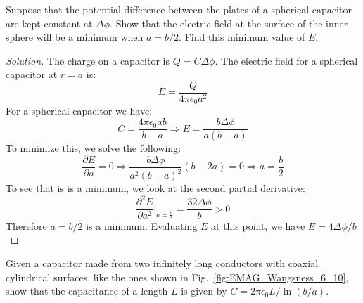 \documentclass[crop=false,class=article,oneside]{standalone}
\begin{document}
        \begin{problem}[Wangsness 6-9]
            Suppose that the potential difference between
            the plates of a spherical capacitor are kept
            constant at $\Delta\phi$. Show that the electric
            field at the surface of the inner sphere will be
            a minimum when $a=b/2$.
            Find this minimum value of $E$.
        \end{problem}
        \begin{proof}[Solution]
            The charge on a capacitor is
            $Q=C\Delta\phi$.
            The electric field for a
            spherical capacitor at $r=a$ is:
            \begin{equation*}
                E=\frac{Q}{4\pi\epsilon_{0}a^{2}}
            \end{equation*}
            For a spherical capacitor we have:
            \begin{equation*}
                C=\frac{4\pi\epsilon_{0}ab}{b-a}
                \Rightarrow
                E=\frac{b\Delta\phi}{a(b-a)}
            \end{equation*}
            To minimize this, we solve the following:
            \begin{equation*}
                \frac{\partial{E}}{\partial{a}}=0
                \Rightarrow
                \frac{b\Delta\phi}{a^{2}(b-a)^{2}}
                (b-2a)=0
                \Rightarrow
                a=\frac{b}{2}
            \end{equation*}
            To see that is is a minimum, we look at the
            second partial derivative:
            \begin{equation*}
                \frac{\partial^2 E}
                     {\partial a^2}\bigg|_{a=\frac{b}{2}}
                =\frac{32\Delta\phi}{b}>0
            \end{equation*}
            Therefore $a=b/2$ is a minimum. Evaluating
            $E$ at this point, we have
            $E=4\Delta\phi/b$
        \end{proof}
        \begin{problem}[Wangsness 6-10]
            \label{problem:EMAG_Wangsness_6_10}
            Given a capacitor made from two infinitely
            long conductors with coaxial cylindrical surfaces,
            like the ones shown in
            Fig.~\ref{fig:EMAG_Wangsness_6_10},
            show that the capacitance of a length $L$
            is given by $C=2\pi\epsilon_{0}L/\ln(b/a)$.
        \end{problem}
\end{document}
